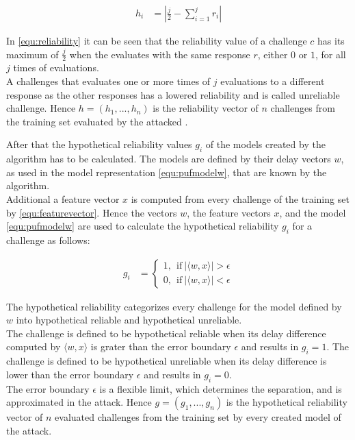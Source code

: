 \begin{align}
h_i &= |\frac{j}{2} - \sum_{i = 1}^{j}r_i| \label{equ:reliability}
\end{align}

In \ref{equ:reliability} it can be seen that the reliability value of a challenge $c$ has its maximum of $\frac{j}{2}$ when the \puf evaluates with the same response $r$, either $0$ or $1$, for all $j$ times of evaluations.\\
A challenges that evaluates one or more times of $j$ evaluations to a different response as the other responses has a lowered reliability and is called unreliable challenge.
Hence $h = (h_1, ..., h_n)$ is the reliability vector of $n$ challenges from the training set evaluated by the attacked \puf.

After that the hypothetical reliability values $g_i$ of the models created by the algorithm has to be calculated.
The models are defined by their delay vectors $w$, as used in the \apuf model representation \ref{equ:pufmodelw}, that are known by the algorithm.\\
Additional a feature vector $x$ is computed from every challenge of the training set by \ref{equ:featurevector}.
Hence the vectors $w$, the feature vectors $x$, and the \apuf model \ref{equ:pufmodelw} are used to calculate the hypothetical reliability $g_i$ for a challenge as follows:

\begin{equation}
\begin{aligned}
g_i &=
\begin{cases}
1,\ \ \text{if}\ |\langle w, x \rangle| > \epsilon\\
0,\ \ \text{if}\ |\langle w, x \rangle| < \epsilon \label{equ:hypotheticalreliability}
\end{cases}
\end{aligned}
\end{equation}

The hypothetical reliability categorizes every challenge for the model defined by $w$ into hypothetical reliable and hypothetical unreliable.\\
The challenge is defined to be hypothetical reliable when its delay difference computed by $\langle w, x \rangle$ is grater than the error boundary $\epsilon$ and results in $g_i = 1$.
The challenge is defined to be hypothetical unreliable when its delay difference is lower than the error boundary $\epsilon$ and results in $g_i = 0$.\\
The error boundary $\epsilon$ is a flexible limit, which determines the separation, and is approximated in the attack.
Hence $g = (g_1, ..., g_n)$ is the hypothetical reliability vector of $n$ evaluated challenges from the training set by every created model of the attack.

